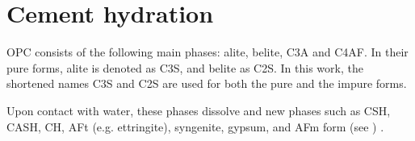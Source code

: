 \FloatBarrier
\section{Cement hydration}

\Ac{OPC} consists of the following main phases: alite, belite, \acf{C3A} and \acf{C4AF}.
In their pure forms, alite is denoted as \acf{C3S}, and belite as \acf{C2S}.
In this work, the shortened names \ac{C3S} and \ac{C2S} are used for both the pure and the impure forms.

Upon contact with water, these phases dissolve and new phases such as \ac{CSH}, \ac{CASH}, \ac{CH}, \ac{AFt} (e.g. ettringite), syngenite, gypsum, and \ac{AFm} form (see ) \cite{moser.2001, stark.2003}.

